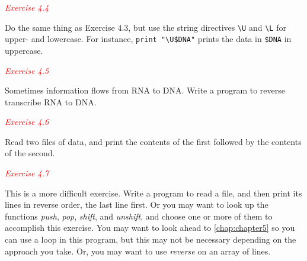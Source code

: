 \textcolor{red}{\textit{Exercise 4.4}}
\begin{adjustwidth}{1cm}{}
Do the same thing as Exercise 4.3, but use the string directives \verb|\U| and \verb|\L| for upper- and lowercase. For instance, \verb|print "\U$DNA"| prints the data in \verb|$DNA| in uppercase. 
\end{adjustwidth}

\textcolor{red}{\textit{Exercise 4.5}}
\begin{adjustwidth}{1cm}{}
Sometimes information flows from RNA to DNA. Write a program to reverse transcribe RNA to DNA. 
\end{adjustwidth}

\textcolor{red}{\textit{Exercise 4.6}}
\begin{adjustwidth}{1cm}{}
Read two files of data, and print the contents of the first followed by the contents of the second. 
\end{adjustwidth}

\textcolor{red}{\textit{Exercise 4.7}}
\begin{adjustwidth}{1cm}{}
This is a more difficult exercise. Write a program to read a file, and then print its lines in reverse order, the last line first. Or you may want to look up the functions \textit{push}, \textit{pop}, \textit{shift}, and \textit{unshift}, and choose one or more of them to accomplish this exercise. You may want to look ahead to \autoref{chap:chapter5} so you can use a loop in this program, but this may not be necessary depending on the approach you take. Or, you may want to use \textit{reverse} on an array of lines. 
\end{adjustwidth}

